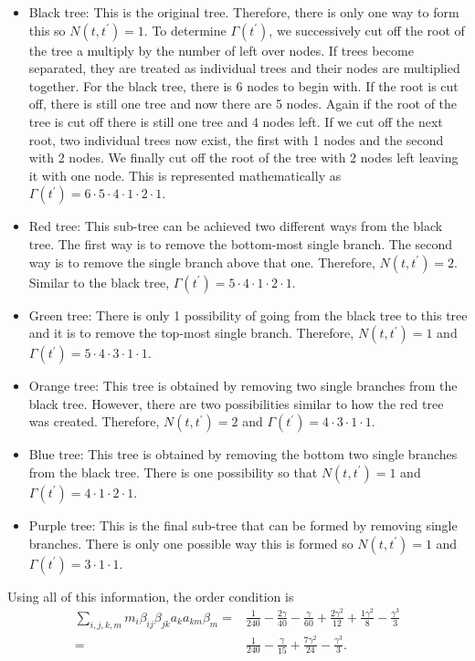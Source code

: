 \documentclass{ansconf}
\numberwithin{equation}{section}
\begin{document}
\begin{itemize}
    \item Black tree: This is the original tree. Therefore, there is only one way to form this so $N\left(t,t^\prime\right) = 1$. To determine $\Gamma\left(t^\prime\right)$, we successively cut off the root of the tree a multiply by the number of left over nodes. If trees become separated, they are treated as individual trees and their nodes are multiplied together. For the black tree, there is 6 nodes to begin with. If the root is cut off, there is still one tree and now there are 5 nodes. Again if the root of the tree is cut off there is still one tree and 4 nodes left. If we cut off the next root, two individual trees now exist, the first with 1 nodes and the second with 2 nodes. We finally cut off the root of the tree with 2 nodes left leaving it with one node. This is represented mathematically as $\Gamma\left(t^\prime\right) =  6\cdot 5\cdot 4\cdot 1\cdot 2\cdot 1$.
    \item {\color{red}Red tree}: This sub-tree can be achieved two different ways from the black tree. The first way is to remove the bottom-most single branch. The second way is to remove the single branch above that one. Therefore, $N\left(t,t^\prime\right) = 2$. Similar to the black tree, $\Gamma\left(t^\prime\right) =  5\cdot 4\cdot 1\cdot 2\cdot 1$.
    \item {\color{green}Green tree}: There is only 1 possibility of going from the black tree to this tree and it is to remove the top-most single branch. Therefore, $N\left(t,t^\prime\right) = 1$ and $\Gamma\left(t^\prime\right) =  5\cdot 4\cdot 3\cdot 1\cdot 1$.
    \item {\color{orange}Orange tree}: This tree is obtained by removing two single branches from the black tree. However, there are two possibilities similar to how the red tree was created. Therefore, $N\left(t,t^\prime\right) = 2$ and $\Gamma\left(t^\prime\right) =  4\cdot 3\cdot 1 \cdot 1$.
    \item {\color{blue}Blue tree}: This tree is obtained by removing the bottom two single branches from the black tree. There is one possibility so that $N\left(t,t^\prime\right) = 1$ and $\Gamma\left(t^\prime\right) =  4\cdot 1\cdot 2\cdot 1$.
    \item {\color{purple}Purple tree}: This is the final sub-tree that can be formed by removing single branches. There is only one possible way this is formed so $N\left(t,t^\prime\right) = 1$ and $\Gamma\left(t^\prime\right) =  3\cdot 1\cdot 1$.
\end{itemize}
Using all of this information, the order condition is
\begin{align}
    \sum_{i,j,k,m} m_{i}\beta_{ij}\beta_{jk}a_{k}a_{km}\beta_{m} = &  \frac{1}{240} - \frac{2\gamma}{40} - \frac{\gamma}{60} + \frac{2\gamma^2}{12} + \frac{1\gamma^2}{8} - \frac{\gamma^3}{3} \\ \nonumber 
      = & \frac{1}{240} - \frac{\gamma}{15} + \frac{7\gamma^2}{24} - \frac{\gamma^3}{3}.
\end{align}
\end{document}
